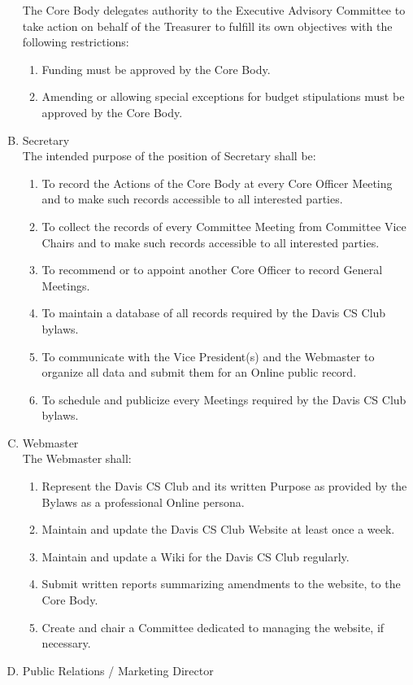 \documentclass{article}
\newenvironment{li}{
\begin{enumerate}
  \setlength{\itemsep}{1pt}
  \setlength{\parskip}{0pt}
  \setlength{\parsep}{0pt}
}{\end{enumerate}}
\begin{document}
\begin{enumerate}[A.]
	\noindent The Core Body delegates authority to the Executive Advisory Committee to take action on behalf of the Treasurer to fulfill its own objectives with the following restrictions:
	\begin{li}
	\item Funding must be approved by the Core Body.
	\item Amending or allowing special exceptions for budget stipulations must be approved by the Core Body.
	\end{li}
\item Secretary\\
	The intended purpose of the position of Secretary shall be:
	\begin{li}
	\item To record the Actions of the Core Body at every Core Officer Meeting and to make such records accessible to all interested parties.
	\item To collect the records of every Committee Meeting from Committee Vice Chairs and to make such records accessible to all interested parties.
	\item To recommend or to appoint another Core Officer to record General Meetings.
	\item To maintain a database of all records required by the Davis CS Club bylaws.
	\item To communicate with the Vice President(s) and the Webmaster to organize all data and submit them for an Online public record.
	\item To schedule and publicize every Meetings required by the Davis CS Club bylaws.
	\end{li}
\item Webmaster\\
	The Webmaster shall:
	\begin{li}
	\item Represent the Davis CS Club and its written Purpose as provided by the Bylaws as a professional Online persona.
	\item Maintain and update the Davis CS Club Website at least once a week.
	\item Maintain and update a Wiki for the Davis CS Club regularly.
	\item Submit written reports summarizing amendments to the website, to the Core Body.
	\item Create and chair a Committee dedicated to managing the website, if necessary.
	\end{li}
\item Public Relations / Marketing Director

\end{enumerate}
\end{document}
